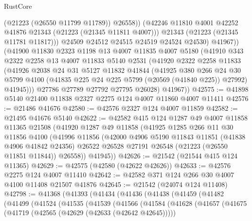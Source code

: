 \begin{lexlean}{RustCore}
\begin{coremodule}
                  (@21223 (@26550 @11799 @11789))
                  @26558))
              (@42246 @11810 @4001 @42252 @41876 @21343 (@21223 (@21345 @11811 @4007)))
              @21343
              (@21223 (@21345 @11781 @11817)))
            @24509
            @24512
            @24515
            @24519
            @24524
            @24530)
          @41967))
      (@41900
        @11830
        @2323
        @1198
        @13
        @4007
        @11835
        @4007
        @5180
        (@41910
          @343
          @2322
          @2258
          @13
          @4007
          @11833
          @5140
          @2531
          (@41920
            @2322
            @2258
            @11833
            (@41926
              @2038
              @24
              @31
              @5127
              @11832
              @41844
              (@41925
                @380
                @266
                @24
                @30
                @5799
                @4100
                (@41835 @225 @24 @225 @5799 (@20569 (@41840 @225)) @27992)
                @41945)))
          @27786
          @27789
          @27792
          @27795
          @26028)
        @41967))
@42575 := @41898 @5140 @21400 @11838 @2327 @2275 @124 @4007 @11860 @4007 @11411
@42576 := @21486 @41676
@42580 := @42576 @2327 @124 @4007 @11859
@42582 := @21495 @41676 @5140
@42622 := @42582
    @415
    @124
    @1287
    @49
    @4007
    @11858
    @11365
    @21508
    (@41920
      @1287
      @49
      @11858
      (@41925
        @1285
        @266
        @11
        @30
        @11856
        @4100
        (@41996
          @11856
          (@42000
            @4906
            @5190
            @11843
            @11851
            (@41838 @4906 @41842 @24356)
            @26522
            @26528
            @27191
            @26548
            (@21223 (@26550 @11851 @11844))
            @26558))
        @41945))
@42626 := @21542 (@21544 @415 @124 @11365)
@42629 := @42575 (@42580 (@42622 @42626))
@42633 := @42576 @2275 @124 @4007 @11410
@42642 := @42582 @371 @124 @266 @30 @4007 @4100 @11408 @21507 @41876
@42645 := @21542 (@24074 @124 @11408)
@42798 := @41368
    (@41393
      (@41434
        (@41436
          (@41438
            (@41459
              (@41482
                (@41499
                  (@41524
                    (@41535
                      (@41539
                        (@41566
                          (@41584
                            (@41628
                              (@41657
                                (@41675
                                  (@41719 (@42565 (@42629 (@42633 (@42642 @42645)))))

\end{coremodule}
\end{lexlean}

